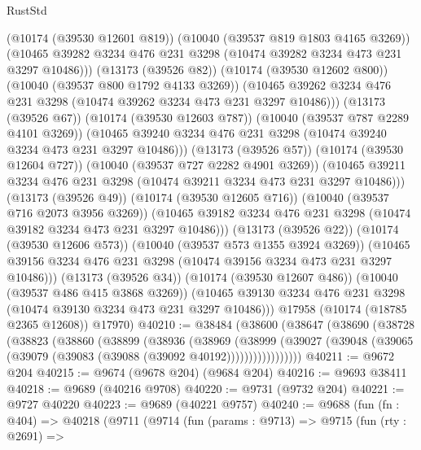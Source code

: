 \begin{lexlean}{RustStd}
\begin{coremodule}
                    (@10174 (@39530 @12601 @819))
                    (@10040 (@39537 @819 @1803 @4165 @3269))
                    (@10465
                      @39282
                      @3234
                      @476
                      @231
                      @3298
                      (@10474 @39282 @3234 @473 @231 @3297 @10486)))
                  (@13173 (@39526 @82))
                  (@10174 (@39530 @12602 @800))
                  (@10040 (@39537 @800 @1792 @4133 @3269))
                  (@10465
                    @39262
                    @3234
                    @476
                    @231
                    @3298
                    (@10474 @39262 @3234 @473 @231 @3297 @10486)))
                (@13173 (@39526 @67))
                (@10174 (@39530 @12603 @787))
                (@10040 (@39537 @787 @2289 @4101 @3269))
                (@10465 @39240 @3234 @476 @231 @3298 (@10474 @39240 @3234 @473 @231 @3297 @10486)))
              (@13173 (@39526 @57))
              (@10174 (@39530 @12604 @727))
              (@10040 (@39537 @727 @2282 @4901 @3269))
              (@10465 @39211 @3234 @476 @231 @3298 (@10474 @39211 @3234 @473 @231 @3297 @10486)))
            (@13173 (@39526 @49))
            (@10174 (@39530 @12605 @716))
            (@10040 (@39537 @716 @2073 @3956 @3269))
            (@10465 @39182 @3234 @476 @231 @3298 (@10474 @39182 @3234 @473 @231 @3297 @10486)))
          (@13173 (@39526 @22))
          (@10174 (@39530 @12606 @573))
          (@10040 (@39537 @573 @1355 @3924 @3269))
          (@10465 @39156 @3234 @476 @231 @3298 (@10474 @39156 @3234 @473 @231 @3297 @10486)))
        (@13173 (@39526 @34))
        (@10174 (@39530 @12607 @486))
        (@10040 (@39537 @486 @415 @3868 @3269))
        (@10465 @39130 @3234 @476 @231 @3298 (@10474 @39130 @3234 @473 @231 @3297 @10486)))
      @17958
      (@10174 (@18785 @2365 @12608))
      @17970)
@40210 := @38484
    (@38600
      (@38647
        (@38690
          (@38728
            (@38823
              (@38860
                (@38899
                  (@38936
                    (@38969
                      (@38999
                        (@39027
                          (@39048 (@39065 (@39079 (@39083 (@39088 (@39092 @40192)))))))))))))))))
@40211 := @9672 @204
@40215 := @9674 (@9678 @204) (@9684 @204)
@40216 := @9693 @38411
@40218 := @9689 (@40216 @9708)
@40220 := @9731 (@9732 @204)
@40221 := @9727 @40220
@40223 := @9689 (@40221 @9757)
@40240 := @9688
    (fun (fn : @404) =>
    @40218
      (@9711
        (@9714
          (fun (params : @9713) =>
          @9715
            (fun (rty : @2691) =>

\end{coremodule}
\end{lexlean}
